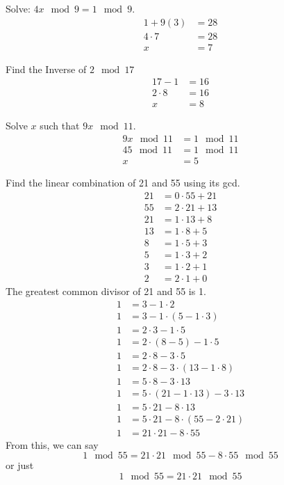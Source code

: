 \documentclass[12pt]{article}
\begin{document}
\begin{example} Solve: $4x \mod 9 = 1 \mod 9$. $$\begin{aligned} 
1 + 9(3) &= 28 \\ 
4 \cdot 7 &= 28 \\
 x &= 7 \end{aligned} $$
\end{example} 

\begin{example} Find the Inverse of $2 \mod 17$ $$\begin{aligned}
17 - 1 &= 16 \\ 
2 \cdot 8 &= 16 \\ 
x &= 8 \end{aligned} $$  \end{example}

\begin{example} Solve $x$ such that $9x \mod 11$. $$\begin{aligned}
9x \mod 11 &= 1 \mod 11 \\
45 \mod 11 &= 1 \mod 11 \\
x &= 5 \end{aligned} $$
\end{example} 

\begin{example} Find the linear combination of 21 and 55 using its gcd. $$\begin{aligned} 
21 &= 0 \cdot 55 + 21 \\ 
55 &= 2 \cdot 21 + 13 \\ 
21 &= 1 \cdot 13 + 8 \\ 
13 &= 1 \cdot 8 + 5 \\
8 &= 1 \cdot 5 + 3 \\ 
5 &= 1 \cdot 3 + 2 \\ 
3 &= 1 \cdot 2 + 1 \\ 
2 &= 2 \cdot 1 + 0 \end{aligned} $$ The greatest common divisor of 21 and 55 is 1. $$\begin{aligned} 
1 &= 3 - 1 \cdot 2 \\
1 &= 3 - 1 \cdot (5 - 1 \cdot 3) \\ 
1 &= 2 \cdot 3 - 1 \cdot 5 \\
1 &= 2 \cdot (8 - 5) - 1 \cdot 5 \\ 
1 &= 2 \cdot 8 - 3 \cdot 5 \\
1 &= 2 \cdot 8 - 3 \cdot (13 - 1 \cdot 8) \\ 
1 &= 5 \cdot 8 - 3 \cdot 13 \\ 
1 &= 5 \cdot (21 - 1 \cdot 13) - 3 \cdot 13 \\ 
1 &= 5 \cdot 21 - 8 \cdot 13 \\ 
1 &= 5 \cdot 21 - 8 \cdot (55 - 2 \cdot 21) \\ 
1 &= 21 \cdot 21 - 8 \cdot 55 \end{aligned} $$
From this, we can say $$1 \mod 55 = 21 \cdot 21 \mod 55 - 8 \cdot 55 \mod 55 $$ or just $$1 \mod 55 = 21 \cdot 21 \mod 55 $$ \end{example}
\end{document}
